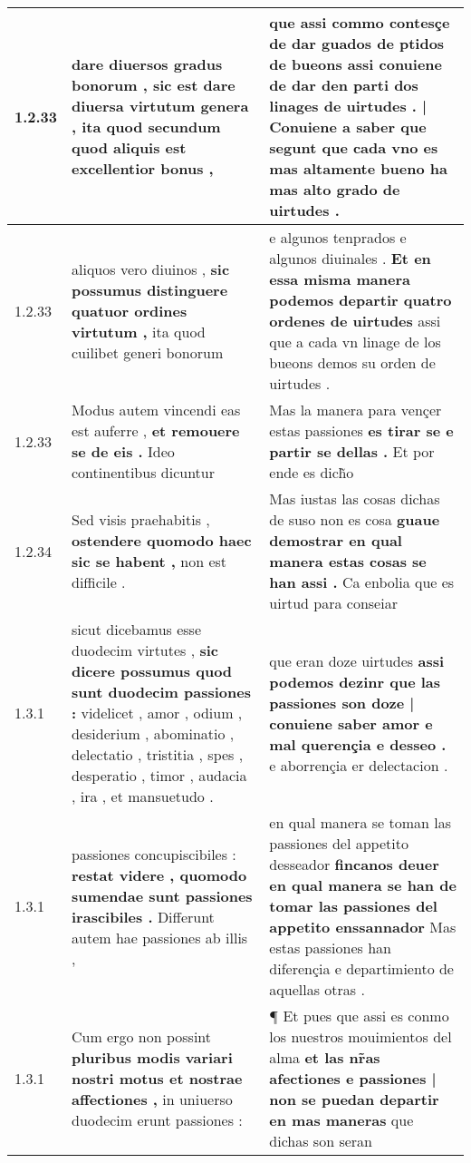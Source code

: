 \begin{tabular}{|p{1cm}|p{6.5cm}|p{6.5cm}|}
1.2.33 & dare diuersos gradus bonorum , \textbf{ sic est dare diuersa virtutum genera , } ita quod secundum quod aliquis est excellentior bonus , & que assi commo contesçe de dar guados de ptidos de bueons \textbf{ assi conuiene de dar den parti dos linages de uirtudes . | Conuiene a saber } que segunt que cada vno es mas altamente bueno ha mas alto grado de uirtudes . \\\hline
1.2.33 & aliquos vero diuinos , \textbf{ sic possumus distinguere quatuor ordines virtutum , } ita quod cuilibet generi bonorum & e algunos tenprados e algunos diuinales . \textbf{ Et en essa misma manera podemos departir quatro ordenes de uirtudes } assi que a cada vn linage de los bueons demos su orden de uirtudes . \\\hline
1.2.33 & Modus autem vincendi eas est auferre , \textbf{ et remouere se de eis . } Ideo continentibus dicuntur & Mas la manera para vençer estas passiones \textbf{ es tirar se e partir se dellas . } Et por ende es dich̃o \\\hline
1.2.34 & Sed visis praehabitis , \textbf{ ostendere quomodo haec sic se habent , } non est difficile . & Mas iustas las cosas dichas de suso non es cosa \textbf{ guaue demostrar en qual manera estas cosas se han assi . } Ca enbolia que es uirtud para conseiar \\\hline
1.3.1 & sicut dicebamus esse duodecim virtutes , \textbf{ sic dicere possumus quod sunt duodecim passiones : } videlicet , amor , odium , desiderium , abominatio , delectatio , tristitia , spes , desperatio , timor , audacia , ira , et mansuetudo . & que eran doze uirtudes \textbf{ assi podemos dezinr que las passiones son doze | conuiene saber amor e mal querençia e desseo . } e aborrençia er delectacion . \\\hline
1.3.1 & passiones concupiscibiles : \textbf{ restat videre , quomodo sumendae sunt passiones irascibiles . } Differunt autem hae passiones ab illis , & en qual manera se toman las passiones del appetito desseador \textbf{ fincanos deuer en qual manera se han de tomar las passiones del appetito enssannador } Mas estas passiones han diferençia e departimiento de aquellas otras . \\\hline
1.3.1 & Cum ergo non possint \textbf{ pluribus modis variari nostri motus et nostrae affectiones , } in uniuerso duodecim erunt passiones : & ¶ Et pues que assi es conmo los nuestros mouimientos del alma \textbf{ et las nr̃as afectiones e passiones | non se puedan departir en mas maneras } que dichas son seran \\\hline

\end{tabular}
